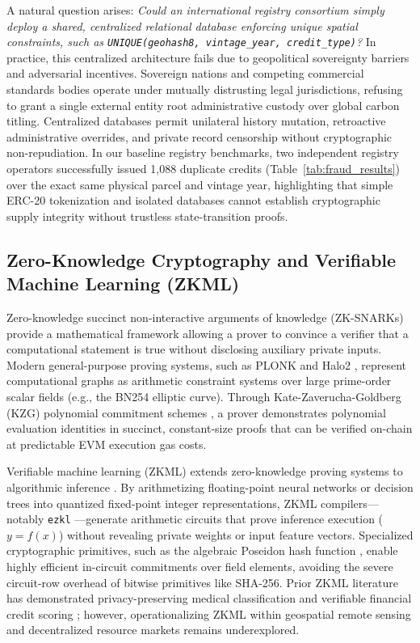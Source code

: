 \documentclass[preprint,12pt]{elsarticle}
\begin{document}
A natural question arises: \textit{Could an international registry consortium simply deploy a shared, centralized relational database enforcing unique spatial constraints, such as \texttt{UNIQUE(geohash8, vintage\_year, credit\_type)}?} In practice, this centralized architecture fails due to geopolitical sovereignty barriers and adversarial incentives. Sovereign nations and competing commercial standards bodies operate under mutually distrusting legal jurisdictions, refusing to grant a single external entity root administrative custody over global carbon titling. Centralized databases permit unilateral history mutation, retroactive administrative overrides, and private record censorship without cryptographic non-repudiation. In our baseline registry benchmarks, two independent registry operators successfully issued 1,088 duplicate credits (Table~\ref{tab:fraud_results}) over the exact same physical parcel and vintage year, highlighting that simple ERC-20 tokenization and isolated databases cannot establish cryptographic supply integrity without trustless state-transition proofs.

\subsection{Zero-Knowledge Cryptography and Verifiable Machine Learning (ZKML)}

Zero-knowledge succinct non-interactive arguments of knowledge (ZK-SNARKs) provide a mathematical framework allowing a prover to convince a verifier that a computational statement is true without disclosing auxiliary private inputs. Modern general-purpose proving systems, such as PLONK and Halo2 \cite{bowe2020halo}, represent computational graphs as arithmetic constraint systems over large prime-order scalar fields (e.g., the BN254 elliptic curve). Through Kate-Zaverucha-Goldberg (KZG) polynomial commitment schemes \cite{kate2010polynomial,groth2016size}, a prover demonstrates polynomial evaluation identities in succinct, constant-size proofs that can be verified on-chain at predictable EVM execution gas costs.

Verifiable machine learning (ZKML) extends zero-knowledge proving systems to algorithmic inference \cite{kang2022scaling}. By arithmetizing floating-point neural networks or decision trees into quantized fixed-point integer representations, ZKML compilers—notably \texttt{ezkl} \cite{ezkl2023engine}—generate arithmetic circuits that prove inference execution ($y = f(x)$) without revealing private weights or input feature vectors. Specialized cryptographic primitives, such as the algebraic Poseidon hash function \cite{grassi2021poseidon}, enable highly efficient in-circuit commitments over field elements, avoiding the severe circuit-row overhead of bitwise primitives like SHA-256. Prior ZKML literature has demonstrated privacy-preserving medical classification and verifiable financial credit scoring \cite{liu2021zkcnn,weng2021mystique}; however, operationalizing ZKML within geospatial remote sensing and decentralized resource markets remains underexplored.
\end{document}
